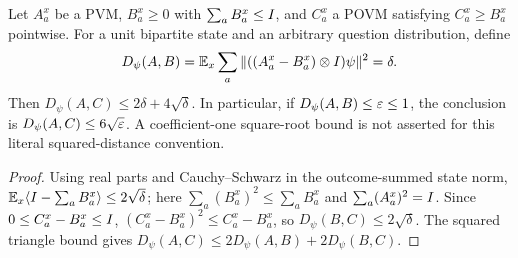 \effortMedium

\begin{lemma}
\label{lem:close-submeasurement}
\leanok
Let $A_a^x$ be a PVM, $B_a^x\geq0$ with $\sum_aB_a^x\leq I$, and
$C_a^x$ a POVM satisfying $C_a^x\geq B_a^x$ pointwise. For a unit
bipartite state and an arbitrary question distribution, define
\[
 D_\psi(A,B)=\mathbb E_x\sum_a
       \|((A_a^x-B_a^x)\otimes I)\psi\|^2=\delta.
\]
Then $D_\psi(A,C)\leq2\delta+4\sqrt\delta$.
In particular, if $D_\psi(A,B)\leq\varepsilon\leq1$, the conclusion is
$D_\psi(A,C)\leq6\sqrt{\varepsilon}$. A coefficient-one square-root bound is not
asserted for this literal squared-distance convention.
\end{lemma}

\begin{proof}
\leanok
Using real parts and Cauchy--Schwarz in the outcome-summed state norm,
$\mathbb E_x\langle I-\sum_aB_a^x\rangle\leq2\sqrt\delta$;
here $\sum_a(B_a^x)^2\leq\sum_aB_a^x$ and $\sum_a(A_a^x)^2=I$.
Since $0\leq C_a^x-B_a^x\leq I$,
$(C_a^x-B_a^x)^2\leq C_a^x-B_a^x$, so $D_\psi(B,C)\leq2\sqrt\delta$.
The squared triangle bound gives $D_\psi(A,C)\leq2D_\psi(A,B)+2D_\psi(B,C)$.
\end{proof}

